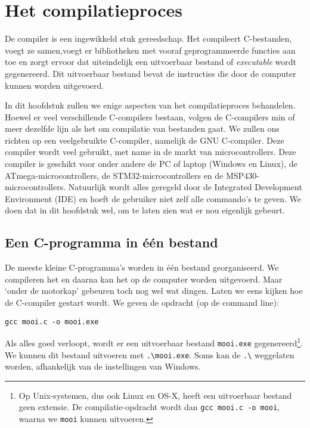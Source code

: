 \chapter{Het compilatieproces}
\label{cha:compilatieproces}
\thispagestyle{empty}

De compiler is een ingewikkeld stuk gereedschap. Het compileert C-bestanden, voegt ze samen,voegt er bibliotheken met vooraf geprogrammeerde functies aan toe en zorgt ervoor dat uiteindelijk een uitvoerbaar bestand of \textsl{executable} wordt gegenereerd. Dit uitvoerbaar bestand bevat de instructies die door de computer kunnen worden uitgevoerd.

In dit hoofdstuk zullen we enige aspecten van het compilatieproces behandelen. Hoewel er veel verschillende C-compilers bestaan, volgen de C-compilers min of meer dezelfde lijn als het om compilatie van bestanden gaat. We zullen ons richten op een veelgebruikte C-compiler, namelijk de GNU C-compiler. Deze compiler wordt veel gebruikt, met name in de markt van microcontrollers. Deze compiler is geschikt voor onder andere de PC of laptop (Windows en Linux), de ATmega-microcontrollers, de STM32-microcontrollers en de MSP430-microcontrollers. Natuurlijk wordt alles geregeld door de Integrated Development Environment (IDE) en hoeft de gebruiker niet zelf alle commando's te geven. We doen dat in dit hoofdstuk wel, om te laten zien wat er nou eigenlijk gebeurt.


\section{Een C-programma in één bestand}
De meeste kleine C-programma's worden in één bestand georganiseerd. We compileren het en daarna kan het op de computer worden uitgevoerd. Maar `onder de motorkap' gebeuren toch nog wel wat dingen. Laten we eens kijken hoe de C-compiler gestart wordt. We geven de opdracht (op de command line):

\hspace*{1em}\texttt{gcc mooi.c -o mooi.exe}

Als alles goed verloopt, wordt er een uitvoerbaar bestand \texttt{mooi.exe} gegenereerd\footnote{Op Unix-systemen, dus ook Linux en OS-X, heeft een uitvoerbaar bestand geen extensie. De compilatie-opdracht wordt dan \texttt{gcc mooi.c -o mooi}, waarna we \texttt{mooi} kunnen uitvoeren.}. We kunnen dit bestand uitvoeren met \texttt{.\textbackslash mooi.exe}. Soms kan de \texttt{.\textbackslash} weggelaten worden, afhankelijk van de instellingen van Windows.


